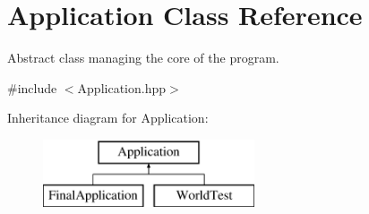 \hypertarget{class_application}{\section{Application Class Reference}
\label{class_application}
}


Abstract class managing the core of the program.  




{\ttfamily \#include $<$Application.\-hpp$>$}

Inheritance diagram for Application\-:\begin{figure}[H]
\begin{center}
\leavevmode
\includegraphics[height=2.000000cm]{class_application}
\end{center}
\end{figure}
